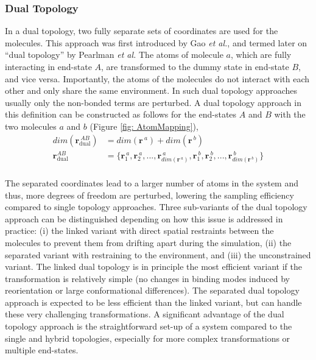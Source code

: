 \subsubsection{Dual Topology}
In a dual topology, two fully separate sets of coordinates are used for the molecules. This approach was first introduced by Gao \textit{et al.},\cite{Gao1989} and termed later on ``dual topology'' by Pearlman \textit{et al.}\cite{Pearlman1991} The atoms of molecule $a$, which are fully interacting in end-state $A$, are transformed to the dummy state in end-state $B$, and vice versa. Importantly, the atoms of the molecules do not interact with each other and only share the same environment.\cite{Riniker2011, Rocklin2013} In such dual topology approaches usually only the non-bonded terms are perturbed.\cite{Riniker2011, Sidler2016, Boresch1999, Michel2010}
%
A dual topology approach in this definition can be constructed as follows for the end-states $A$ and $B$ with the two molecules $a$ and $b$ (Figure \ref{fig: AtomMapping}),
\begin{align*}
    dim(\textbf{r}_{\text{dual}}^{~AB}) &= dim(\textbf{r}^{~a}) + dim(\textbf{r}^{~b})\\
    \textbf{r}^{AB}_{\text{dual}} &= \{\textbf{r}^{~a}_{1}, \textbf{r}^{~a}_{2}, ..., \textbf{r}^{~a}_{dim(\textbf{r}^{~a})}, \textbf{r}^{~b}_{1}, \textbf{r}^{~b}_{2}, ..., \textbf{r}^{~b}_{dim(\textbf{r}^{~b})}\}\\
\end{align*}

The separated coordinates lead to a larger number of atoms in the system and thus, more degrees of freedom are perturbed, lowering the sampling efficiency compared to single topology approaches. 
Three sub-variants of the dual topology approach can be distinguished depending on how this issue is addressed in practice:
(i) the linked variant with direct spatial restraints between the molecules to prevent them from drifting apart during the simulation,\cite{Riniker2011, Sidler2016, Christ2009A, Jespers2019} (ii) the separated variant with restraining to the environment,\cite{Mobley2006, Rocklin2013} and (iii) the unconstrained variant.\cite{Henine2004, Carvalho2021}
The linked dual topology is in principle the most efficient variant if the transformation is relatively simple (no changes in binding modes induced by reorientation or large conformational differences). The separated dual topology approach is expected to be less efficient than the linked variant, but can handle these very challenging transformations.\cite{Mobley2006}
A significant advantage of the dual topology approach is the straightforward set-up of a system compared to the single and hybrid topologies, especially for more complex transformations or multiple end-states.

